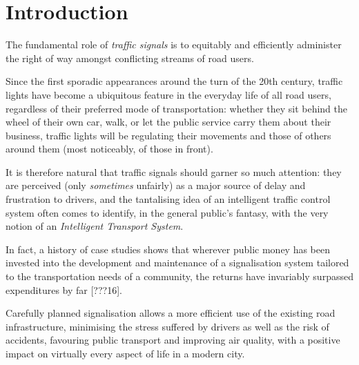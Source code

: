 \chapter*{Introduction}
The fundamental role of \emph{traffic signals} is to equitably and efficiently administer the right of way amongst conflicting streams of road users.

Since the first sporadic appearances around the turn of the 20th century, traffic lights have become a ubiquitous feature in the everyday life of all road users, regardless of their preferred mode of transportation: whether they sit behind the wheel of their own car, walk, or let the public service carry them about their business, traffic lights will be regulating their movements and those of others around them (most noticeably, of those in front).

It is therefore natural that traffic signals should garner so much attention: they are perceived (only \emph{sometimes} unfairly) as a major source of delay and frustration to drivers, and the tantalising idea of an intelligent traffic control system often comes to identify, in the general public’s fantasy, with the very notion of an \emph{Intelligent Transport System}.

In fact, a history of case studies shows that wherever public money has been invested into the development and maintenance of a signalisation system tailored to the transportation needs of a community, the returns have invariably surpassed expenditures by far [???16].

Carefully planned signalisation allows a more efficient use of the existing road infrastructure,
minimising the stress suffered by drivers as well as the risk of accidents,
favouring public transport and improving air quality, with a positive impact on virtually every aspect of life in a modern city.


